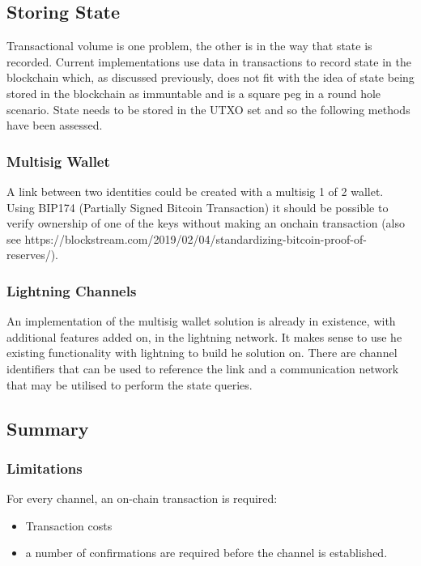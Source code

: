 \documentclass[10pt,a4paper]{runcrypto}
\begin{document}
\subsection{Storing State}
Transactional volume is one problem, the other is in the way that state is recorded. Current implementations use data in transactions to record state in the blockchain which, as discussed previously, does not fit with the idea of state being stored in the blockchain as immuntable and is a square peg in a round hole scenario. State needs to be stored in the UTXO set and so the following methods have been assessed.

\subsubsection{Multisig Wallet}

A link between two identities could be created with a multisig 1 of 2 wallet. Using BIP174 (Partially Signed Bitcoin Transaction) it should be possible to verify ownership of one of the keys without making an onchain transaction (also see https://blockstream.com/2019/02/04/standardizing-bitcoin-proof-of-reserves/).

\subsubsection{Lightning Channels}

An implementation of the multisig wallet solution is already in existence, with additional features added on, in the lightning network. It makes sense to use he existing functionality with lightning to build he solution on. There are channel identifiers that can be used to reference the link and a communication network that may be utilised to perform the state queries.

\subsection{Summary}

\subsubsection{Limitations}
For every channel, an on-chain transaction is required:
\begin{itemize}
	\item Transaction costs
	\item a number of confirmations are required before the channel is established.
\end{itemize}
\end{document}

